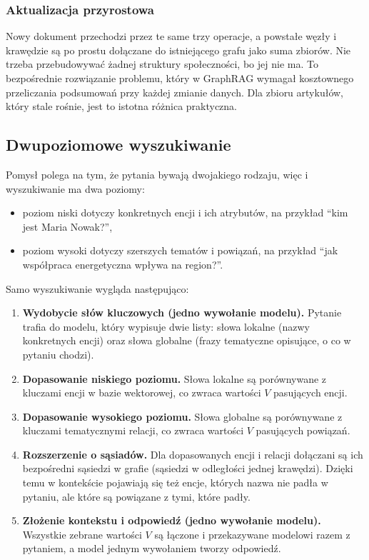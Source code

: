\documentclass[11pt,a4paper]{article}
\begin{document}
\subsubsection{Aktualizacja przyrostowa}

Nowy dokument przechodzi przez te same trzy operacje, a powstałe węzły i krawędzie są po
prostu dołączane do istniejącego grafu jako suma zbiorów. Nie trzeba przebudowywać żadnej
struktury społeczności, bo jej nie ma. To bezpośrednie rozwiązanie problemu, który w GraphRAG
wymagał kosztownego przeliczania podsumowań przy każdej zmianie danych. Dla zbioru artykułów,
który stale rośnie, jest to istotna różnica praktyczna.

\subsection{Dwupoziomowe wyszukiwanie}

Pomysł polega na tym, że pytania bywają dwojakiego rodzaju, więc i wyszukiwanie ma dwa
poziomy:

\begin{itemize}[itemsep=2pt]
  \item poziom niski dotyczy konkretnych encji i ich atrybutów, na przykład
        \enquote{kim jest Maria Nowak?},
  \item poziom wysoki dotyczy szerszych tematów i powiązań, na przykład
        \enquote{jak współpraca energetyczna wpływa na region?}.
\end{itemize}

Samo wyszukiwanie wygląda następująco:

\begin{enumerate}[itemsep=3pt]
  \item \textbf{Wydobycie słów kluczowych (jedno wywołanie modelu).} Pytanie trafia do
        modelu, który wypisuje dwie listy: słowa lokalne (nazwy konkretnych encji) oraz słowa
        globalne (frazy tematyczne opisujące, o co w pytaniu chodzi).
  \item \textbf{Dopasowanie niskiego poziomu.} Słowa lokalne są porównywane z kluczami encji
        w bazie wektorowej, co zwraca wartości $V$ pasujących encji.
  \item \textbf{Dopasowanie wysokiego poziomu.} Słowa globalne są porównywane z kluczami
        tematycznymi relacji, co zwraca wartości $V$ pasujących powiązań.
  \item \textbf{Rozszerzenie o sąsiadów.} Dla dopasowanych encji i relacji dołączani są ich
        bezpośredni sąsiedzi w grafie (sąsiedzi w odległości jednej krawędzi). Dzięki temu w
        kontekście pojawiają się też encje, których nazwa nie padła w pytaniu, ale które są
        powiązane z tymi, które padły.
  \item \textbf{Złożenie kontekstu i odpowiedź (jedno wywołanie modelu).} Wszystkie zebrane
        wartości $V$ są łączone i przekazywane modelowi razem z pytaniem, a model jednym
        wywołaniem tworzy odpowiedź.
\end{enumerate}
\end{document}
